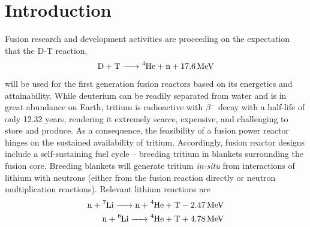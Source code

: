 

\chapter{Introduction} \label{sec:introduction}
Fusion research and development activities are proceeding on the expectation that the D-T reaction,
\begin{align}
\ce{D + T -> ^4He + n}+ \SI{17.6}{\mega\electronvolt}
\end{align}
will be used for the first generation fusion reactors based on its energetics and attainability. While deuterium can be readily separated from water and is in great abundance on Earth, tritium is radioactive with $\beta^-$ decay with a half-life of only 12.32 years, rendering it extremely scarce, expensive, and challenging to store and produce. As a consequence, the feasibility of a fusion power reactor hinges on the sustained availability of tritium. Accordingly, fusion reactor designs include a self-sustaining fuel cycle -- breeding tritium in blankets surrounding the fusion core. Breeding blankets will generate tritium \textit{in-situ} from interactions of lithium with neutrons (either from the fusion reaction directly or neutron multiplication reactions). Relevant lithium reactions are
\begin{align}
\ce{n + ^7Li -> n + ^4He + T}-\SI{2.47}{\mega\electronvolt} \label{eq:Li7T} \\
\ce{n + ^6Li -> ^4He + T} + \SI{4.78}{\mega\electronvolt} \label{eq:Li6T}
\end{align}

